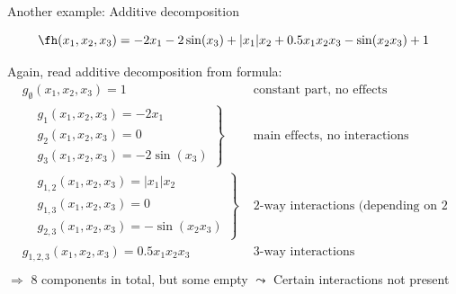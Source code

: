 \documentclass[11pt,compress,t,notes=noshow, aspectratio=169, xcolor=table]{beamer}
\begin{document}
\begin{frame}{Another example: Additive decomposition}

    \begin{example}


        $$
        \fh(x_1, x_2, x_3) = - 2x_1 - 2\sin(x_3) + |x_1|x_2 + 0.5 x_1 x_2 x_3 - \sin(x_2 x_3) + 1
        $$

        Again, read additive decomposition from formula:
        \pause
        \begin{equation}\label{eq:func_decomp_second_min_example}
        \begin{aligned}
            & g_\emptyset(x_1, x_2, x_3) = 1 & \text{ constant part, no effects}  \\
            &
            \left.\begin{aligned}
                & g_1(x_1, x_2, x_3) = - 2x_1 \\
                & g_2(x_1, x_2, x_3) = 0 \\
                & g_3(x_1, x_2, x_3) = - 2\sin(x_3)
            \end{aligned}\right\}
                & \text{ main effects, no interactions}  \\
            &
            \left.\begin{aligned}
                & g_{1,2}(x_1, x_2, x_3) = |x_1|x_2 \\
                & g_{1,3}(x_1, x_2, x_3) = 0 \\
                & g_{2,3}(x_1, x_2, x_3) = - \sin(x_2 x_3)
            \end{aligned}\right\}
                & \text{ 2-way interactions (depending on 2 features)}  \\
            & g_{1,2,3}(x_1, x_2, x_3) = 0.5 x_1 x_2 x_3 & \text{ 3-way interactions}  \\
        \end{aligned}
        \end{equation}
        \(\Rightarrow\) 8 components in total, but some empty $\leadsto$ Certain interactions not present
        
    \end{example}
    
\end{frame}
\end{document}
